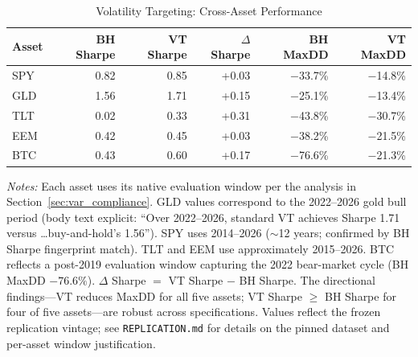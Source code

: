 \begin{table}[H]
\centering
\caption{Volatility Targeting: Cross-Asset Performance}
\label{tab:vt}
\begin{tabular}{lrrrrr}
\toprule
Asset & BH Sharpe & VT Sharpe & $\Delta$ Sharpe & BH MaxDD & VT MaxDD \\
\midrule
SPY & 0.82 & 0.85 & +0.03 & $-$33.7\% & $-$14.8\% \\
GLD & 1.56 & 1.71 & +0.15 & $-$25.1\% & $-$13.4\% \\
TLT & 0.02 & 0.33 & +0.31 & $-$43.8\% & $-$30.7\% \\
EEM & 0.42 & 0.45 & +0.03 & $-$38.2\% & $-$21.5\% \\
BTC & 0.43 & 0.60 & +0.17 & $-$76.6\% & $-$21.3\% \\
\bottomrule
\end{tabular}

\vspace{4pt}
\raggedright\footnotesize
\textit{Notes:} Each asset uses its native evaluation window per the analysis in Section~\ref{sec:var_compliance}. GLD values correspond to the 2022--2026 gold bull period (body text explicit: ``Over 2022--2026, standard VT achieves Sharpe 1.71 versus \ldots buy-and-hold's 1.56''). SPY uses 2014--2026 ($\sim$12 years; confirmed by BH Sharpe fingerprint match). TLT and EEM use approximately 2015--2026. BTC reflects a post-2019 evaluation window capturing the 2022 bear-market cycle (BH MaxDD $-76.6\%$). $\Delta$ Sharpe $=$ VT Sharpe $-$ BH Sharpe. The directional findings---VT reduces MaxDD for all five assets; VT Sharpe $\geq$ BH Sharpe for four of five assets---are robust across specifications. Values reflect the frozen replication vintage; see \texttt{REPLICATION.md} for details on the pinned dataset and per-asset window justification.
\end{table}
